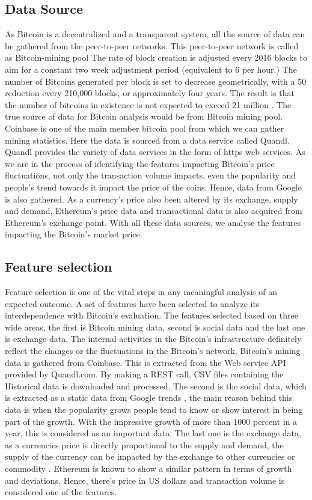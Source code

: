 \documentclass[sigconf]{acmart}
\begin{document}
 
 \subsection{Data Source}
 As Bitcoin is a decentralized and a transparent system, all the source of data can be gathered from the peer-to-peer networks. This peer-to-peer network is called as Bitcoin-mining pool \cite{1:online}
 The rate of block creation is adjusted every 2016 blocks to aim for a constant two week adjustment period (equivalent to 6 per hour.) The number of Bitcoins generated per block is set to decrease geometrically, with a 50 reduction every 210,000 blocks, or approximately four years. The result is that the number of bitcoins in existence is not expected to exceed 21 million \cite{2:online}.
The true source of data for Bitcoin analysis would be from Bitcoin mining pool. Coinbase is one of the main member bitcoin pool from which we can gather mining statistics. Here the data is sourced from a data service called Quandl. Quandl provides the variety of data services in the form of https web services. As we are in the process of identifying the features impacting Bitcoin's price fluctuations, not only the transaction volume impacts, even the popularity and people's trend towards it impact the price of the coins. Hence, data from Google is also gathered. As a currency's price also been altered by its exchange, supply and demand, Ethereum's price data and transactional data is also acquired from Ethereum's exchange point.
With all these data sources, we analyse the features impacting the Bitcoin's market price. 
 
 
 \subsection{Feature selection}
 Feature selection is one of the vital steps in any meaningful analysis of an expected outcome. A set of features have been selected to analyze its interdependence with Bitcoin's evaluation. The features selected based on three wide areas, the first is Bitcoin mining data, second is social data and the last one is exchange data.
 The internal activities in the Bitcoin's infrastructure definitely reflect the changes or the fluctuations in the Bitcoin's network, Bitcoin's mining data is gathered from Coinbase. This is extracted from the Web service API provided by Quandl.com\cite{3:online}. By making a REST call, CSV files containing the Historical data is downloaded and processed.
 The second is the social data, which is extracted as a static data from Google trends \cite{google:online}, the main reason behind this data is when the popularity grows people tend to know or show interest in being part of the growth. With the impressive growth of more than 1000 percent in a year, this is considered as an important data.
 The last one is the exchange data, as a currencies price is directly proportional to the supply and demand, the supply of the currency can be impacted by the exchange to other currencies or commodity \cite{4:online}. Ethereum is known to show a similar pattern in terms of growth and deviations\cite{Ethereum:online}. Hence, there's price in US dollars and transaction volume is considered one of the features.
\end{document}
